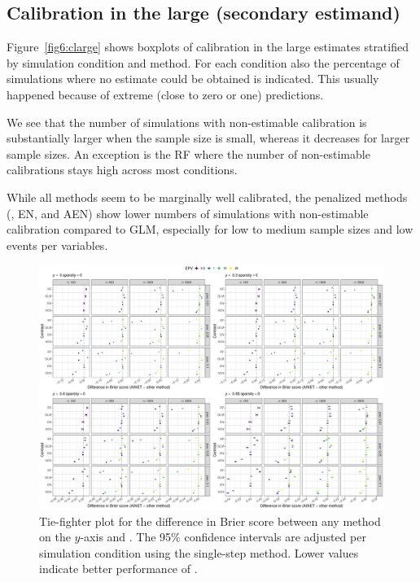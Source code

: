 \begin{subappendices}
\subsection{Calibration in the large (secondary estimand)}

Figure~\ref{fig6:clarge} shows boxplots of calibration in the large estimates
stratified by simulation condition and method. For each condition also the
percentage of simulations where no estimate could be obtained is indicated. This
usually happened because of extreme (close to zero or one) predictions.

We see that the number of simulations with non-estimable calibration is
substantially larger when the sample size is small, whereas it decreases for
larger sample sizes. An exception is the RF where the number of non-estimable
calibrations stays high across most conditions.

While all methods seem to be marginally well calibrated, the penalized methods
(\ainet{}, EN, and AEN) show lower numbers of simulations with non-estimable
calibration compared to GLM, especially for low to medium sample sizes and low
events per variables.

\begin{landscape}
\begin{figure}[!ht]
\center
\includegraphics[width=0.9\linewidth]{images/paper6/tie-fighter_brier_sparsity0.pdf}
\caption{Tie-fighter plot for the difference in Brier score between any method
  on the $y$-axis and \ainet{}. The 95\% confidence intervals are adjusted per
  simulation condition using the single-step method. Lower values indicate
  better performance of \ainet{}. } \label{fig6:tiebrier}
\end{figure}
\end{landscape}


\end{subappendices}
